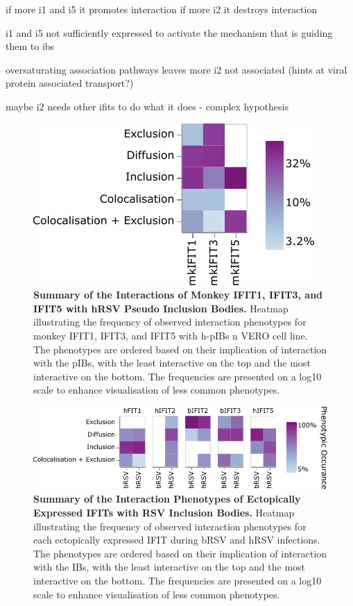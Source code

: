 if more i1 and i5 it promotes interaction
if more i2 it destroys interaction


i1 and i5 not sufficiently expressed to activate the mechanism that is guiding them to ibs

oversaturating association pathways leaves more i2 not associated (hints at viral protein associated transport?)

maybe i2 needs other ifits to do what it does - complex hypothesis

\begin{figure}
    \centering
    \includegraphics[width=0.6\linewidth]{09. Chapter 4/Figs/heatmap-vero-hnhp-i135.pdf}
    \caption[Summary of the Interactions of Monkey IFIT1, IFIT3, and IFIT5 with hRSV Pseudo Inclusion Bodies.]{\textbf{Summary of the Interactions of Monkey IFIT1, IFIT3, and IFIT5 with hRSV Pseudo Inclusion Bodies.} Heatmap illustrating the frequency of observed interaction phenotypes for monkey IFIT1, IFIT3, and IFIT5 with h-pIBs n VERO cell line. The phenotypes are ordered based on their implication of interaction with the pIBs, with the least interactive on the top and the most interactive on the bottom. The frequencies are presented on a log10 scale to enhance visualisation of less common phenotypes.}
    \label{fig:Summary of the Interactions of Monkey IFIT1, IFIT3, and IFIT5 with hRSV Pseudo Inclusion Bodies}
\end{figure}


\begin{figure}
    \centering
    \includegraphics[width=1\linewidth]{09. Chapter 4/Figs/heatmap-infection-transfection.pdf}
    \caption[Summary of the Interaction Phenotypes of Ectopically Expressed IFITs with RSV Inclusion Bodies.]{\textbf{Summary of the Interaction Phenotypes of Ectopically Expressed IFITs with RSV Inclusion Bodies.} Heatmap illustrating the frequency of observed interaction phenotypes for each ectopically expressed IFIT during bRSV and hRSV infections. The phenotypes are ordered based on their implication of interaction with the IBs, with the least interactive on the top and the most interactive on the bottom. The frequencies are presented on a log10 scale to enhance visualisation of less common phenotypes.}
    \label{fig:Summary of the Interaction Phenotypes of Ectopically Expressed IFITs with RSV Inclusion Bodies}
\end{figure}


